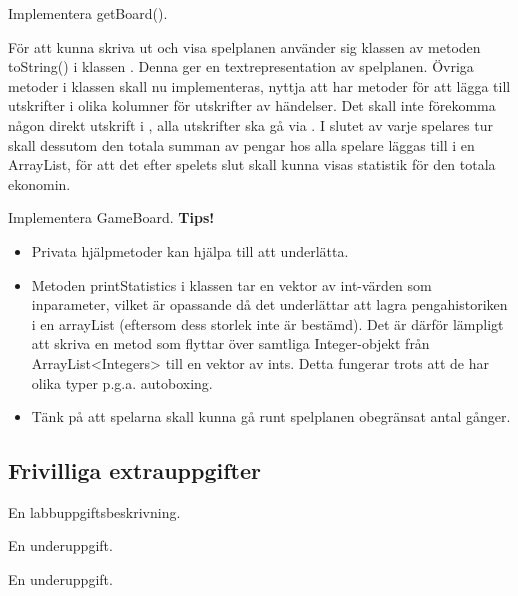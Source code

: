 \Subtask Implementera getBoard().

\Task För att kunna skriva ut och visa spelplanen använder sig klassen   av metoden toString() i klassen . Denna ger en textrepresentation av spelplanen. Övriga metoder i klassen  skall nu implementeras, nyttja att   har metoder för att lägga till utskrifter i olika kolumner för utskrifter av händelser. Det skall inte förekomma någon direkt utskrift i  , alla utskrifter ska gå via . I slutet av varje spelares tur skall dessutom den totala summan av pengar hos alla spelare läggas till i en ArrayList, för att det efter spelets slut skall kunna visas statistik för den totala ekonomin.

\Subtask Implementera GameBoard.
\newline
\newline
\textbf{Tips!} 

\begin{itemize}
\item Privata hjälpmetoder kan hjälpa till att underlätta.
\item Metoden printStatistics i klassen  tar en vektor av int-värden som inparameter, vilket är opassande då det underlättar att lagra pengahistoriken i en arrayList (eftersom dess storlek inte är bestämd). Det är därför lämpligt att skriva en metod som flyttar över samtliga Integer-objekt från ArrayList<Integers> till en vektor av ints. Detta fungerar trots att de har olika typer p.g.a. autoboxing. 
\item Tänk på att spelarna skall kunna gå runt spelplanen obegränsat antal gånger.

\end{itemize}




\subsection{Frivilliga extrauppgifter}

\Task En labbuppgiftsbeskrivning.

\Subtask En underuppgift.

\Subtask En underuppgift.
    